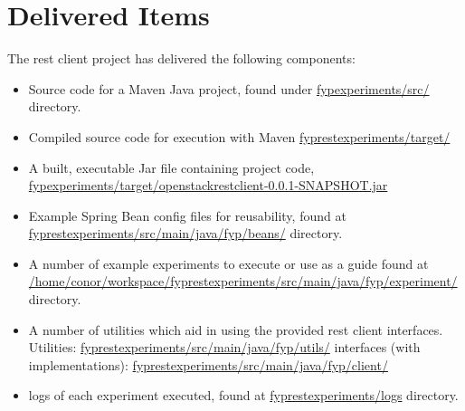 \section{Delivered Items}
The rest client project has delivered the following components: 
\begin{itemize}
\item Source code for a Maven Java project, found under \url{fypexperiments/src/} directory.
\item Compiled source code for execution with Maven \url{fyprestexperiments/target/}
\item A built, executable Jar file containing project code, \url{fypexperiments/target/openstackrestclient-0.0.1-SNAPSHOT.jar}
\item Example Spring Bean config files for reusability, found at \url{fyprestexperiments/src/main/java/fyp/beans/} directory.
\item A number of example experiments to execute or use as a guide found at \url{/home/conor/workspace/fyprestexperiments/src/main/java/fyp/experiment/}
directory.
\item A number of utilities which aid in using the provided rest client interfaces. Utilities: \url{fyprestexperiments/src/main/java/fyp/utils/} interfaces (with implementations): \url{fyprestexperiments/src/main/java/fyp/client/} 
\item logs of each experiment executed, found at \url{fyprestexperiments/logs} directory.
\end{itemize}



